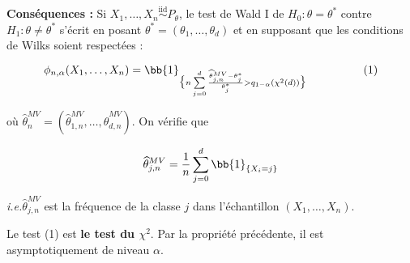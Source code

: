 \documentclass[12pt]{article}
\newcommand{\espace}{\vspace{1.5em}}
\newcommand{\petitespace}{\vspace{0.5cm}}
\newcommand{\shift}{\hspace{2em}}
\newcommand{\ie}{\textit{i.e.}}
\newcommand{\somme}[2]{\sum\limits_{#1}^{#2}}
\newcommand{\chideux}[1]{\chi^2(#1)} %
\newcommand{\Xunan}{X_1,\ldots,X_n} %
\newcommand{\EMV}{\widehat{\theta}_n^{MV}}
\newcommand{\simiid}{\overset{\text{iid}}{\sim}}
\newcommand{\1}{\bb{1}} %
\begin{document}
\textbf{Conséquences :} Si $\Xunan \simiid P_\theta$, le test de Wald I de $H_0 : \theta = \theta^*$ contre $H_1 : \theta \ne \theta^*$ s'écrit en posant $\theta^*= (\theta_1, \ldots, \theta_d)$ et en supposant que les conditions de Wilks soient respectées :

$$\phi_{n,\alpha}(\Xunan) = \1_{\big\{ n\somme{j=0}{d}\frac{\widehat \theta^{MV}_{j,n} -\theta^*_j}{\theta^*_j} > q_{1-\alpha}(\chideux{d})\big\} }\quad\quad\quad\quad\quad  \text{(1)}$$  

où $\EMV = (\widehat \theta^{MV}_{1,n}, \ldots, \widehat \theta^{MV}_{d,n})$. On vérifie que 

$$\widehat \theta^{MV}_{j,n} = \frac 1n \somme{j=0}{d}\1_{\{X_i=j\}} $$

\ie \shift $\widehat \theta^{MV}_{j,n}$ est la fréquence de la classe $j$ dans l'échantillon $(\Xunan)$.\petitespace

Le test (1) est \textbf{le test du $\chi^2$}. Par la propriété précédente, il est asymptotiquement de niveau $\alpha$.

\espace
\end{document}
